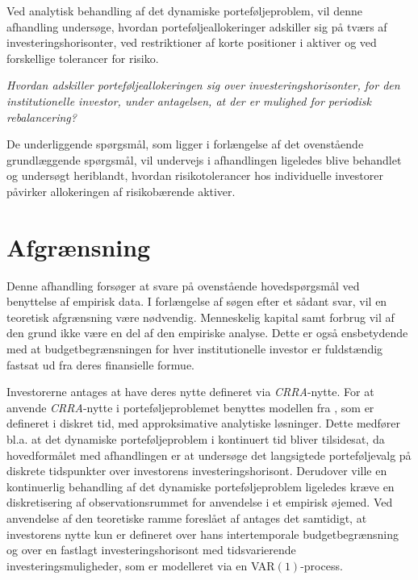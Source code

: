 \documentclass[
  a4paper,
  oneside]{memoir}
\begin{document}
Ved analytisk behandling af det dynamiske porteføljeproblem, vil denne afhandling undersøge, hvordan porteføljeallokeringer adskiller sig på tværs af investeringshorisonter, ved restriktioner af korte positioner i aktiver og ved forskellige tolerancer for risiko.

\begin{center}
\textit{Hvordan adskiller porteføljeallokeringen sig over investeringshorisonter, for den institutionelle investor, under antagelsen, at der er mulighed for periodisk rebalancering?}
\end{center}

De underliggende spørgsmål, som ligger i forlængelse af det ovenstående grundlæggende spørgsmål, vil undervejs i afhandlingen ligeledes blive behandlet og undersøgt heriblandt, hvordan risikotolerancer hos individuelle investorer påvirker allokeringen af risikobærende aktiver.

\hypertarget{afgruxe6nsning}{%
\section{Afgrænsning}\label{afgruxe6nsning}}

Denne afhandling forsøger at svare på ovenstående hovedspørgsmål ved benyttelse af empirisk data. I forlængelse af søgen efter et sådant svar, vil en teoretisk afgrænsning være nødvendig. Menneskelig kapital samt forbrug vil af den grund ikke være en del af den empiriske analyse. Dette er også ensbetydende med at budgetbegrænsningen for hver institutionelle investor er fuldstændig fastsat ud fra deres finansielle formue.

Investorerne antages at have deres nytte defineret via \emph{CRRA}-nytte. For at anvende \emph{CRRA}-nytte i porteføljeproblemet benyttes modellen fra \citep{JurVic2011}, som er defineret i diskret tid, med approksimative analytiske løsninger. Dette medfører bl.a. at det dynamiske porteføljeproblem i kontinuert tid bliver tilsidesat, da hovedformålet med afhandlingen er at undersøge det langsigtede porteføljevalg på diskrete tidspunkter over investorens investeringshorisont. Derudover ville en kontinuerlig behandling af det dynamiske porteføljeproblem ligeledes kræve en diskretisering af observationsrummet for anvendelse i et empirisk øjemed. Ved anvendelse af den teoretiske ramme foreslået af \citep{JurVic2011} antages det samtidigt, at investorens nytte kun er defineret over hans intertemporale budgetbegrænsning og over en fastlagt investeringshorisont med tidsvarierende investeringsmuligheder, som er modelleret via en VAR\((1)\)-process.
\end{document}
